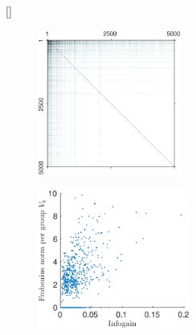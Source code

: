 \documentclass[twoside,11pt]{article}
\newcommand\mat[1]{{#1}}
\newcommand{\W}{\mat{W}}
\begin{document}
\begin{figure}[ht]
\captionsetup{font=small}
[\FBwidth]
{\caption{Structured sparsity and extracted features. {\bf (a)} A heat map of the absolute values of the elements of $\W$ trained on RCV1, illustrating the structured sparseness of the learned metric. Features are ordered by their information gain.  {\bf (b)} Frob. norm of the groups $V_k$ against the information gain of feature $k$. Sparse COMET assigns zero weights to less-informative features.}\label{fig:spmatrix}}
{
\begin{subfigure}[]
  \centering
  \includegraphics[trim=0 -0.5cm 0 0,width=4.7cm]{sparse_W_visualization}
\end{subfigure}%
\begin{subfigure}[]
  \centering
  \includegraphics[trim=0 0cm 0 0,width=5cm]{V_features_vs_infogain}
\end{subfigure}%
\setcounter{subfigure}{0} %
\setcounter{figure}{3} %
}
\vskip -10pt
\end{figure}


\vspace{-6pt}
\end{document}
